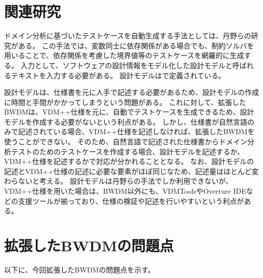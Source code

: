 \documentclass[uplatex, report, a4j, 10pt]{jsbook}
\newcommand{\tool}{BWDM}
\begin{document}
\section{関連研究}

ドメイン分析に基づいたテストケースを自動生成する手法としては、丹野らの研究\cite{sekkeiModel}がある。
この手法では、変数同士に依存関係がある場合でも、制約ソルバ\cite{sat}を用いることで、依存関係を考慮した境界値等のテストケースを網羅的に生成する。
入力として、ソフトウェアの設計情報をモデル化した設計モデルと呼ばれるテキストを入力する必要がある。
設計モデルは\cite{sekkeiModel}で定義されている。

設計モデルは、仕様書を元に人手で記述する必要があるため、設計モデルの作成に時間と手間がかかってしまうという問題がある。
これに対して、拡張したBWDMは、VDM++仕様を元に、自動でテストケースを生成できるため、設計モデルを作成する必要がないという利点がある。
しかし、仕様書が自然言語のみで記述されている場合、VDM++仕様を記述しなければ、拡張したBWDMを使うことができない。
そのため、自然言語で記述された仕様書からドメイン分析テストのためのテストケースを作成する場合、設計モデルを記述するか、VDM++仕様を記述するかで対応が分かれることとなる。
なお、設計モデルの記述とVDM++仕様の記述に必要な要素がほぼ同じなため、記述量はほとんど変わらないと考える。
設計モデルは丹野らの手法でしか利用できないが、VDM++仕様を用いた場合は、BWDM以外にも、VDMTools\cite{vdmtools}やOverture IDE\cite{overture}などの支援ツールが揃っており、仕様の検証や記述を行いやすいという利点がある。

\section{拡張した\tool{}の問題点}
以下に、今回拡張したBWDMの問題点を示す。
\end{document}
